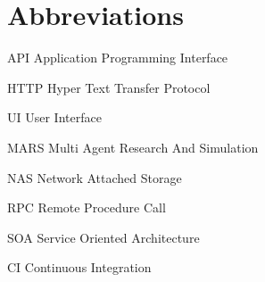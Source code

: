     \newcommand{\abbrlabel}[1]{\makebox[3cm][l]{\textbf{#1}\ }}
\newenvironment{abbreviations}{\begin{list}{}{\renewcommand{\makelabel}{\abbrlabel}}}{\end{list}}
%

\newpage
\section*{Abbreviations}
\begin{abbreviations}
\item[API] Application Programming Interface
\item[HTTP] Hyper Text Transfer Protocol
\item[UI] User Interface
\item[MARS] Multi Agent Research And Simulation
\item[NAS] Network Attached Storage
\item[RPC] Remote Procedure Call
\item[SOA] Service Oriented Architecture
\item[CI] Continuous Integration
\end{abbreviations}
%